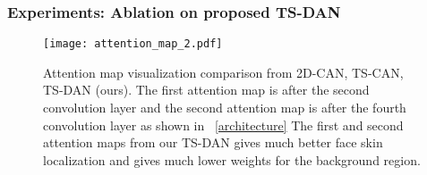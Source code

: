\documentclass[aspectratio=169, table]{beamer}
\begin{document}

\begin{frame}
	\frametitle{\textbf{Experiments: Ablation on proposed TS-DAN}}

\begin{figure}
\begin{center}
\texttt{[image: attention\_map\_2.pdf]}
\end{center}
\caption{Attention map visualization comparison from 2D-CAN\cite{chen2018deepphys}, TS-CAN\cite{liu2020multi}, TS-DAN (ours). The first attention map is after the second convolution layer and the second attention map is after the fourth convolution layer as shown in \figurename~\ref{architecture} The first and second attention maps from our TS-DAN gives much better face skin localization and gives much lower weights for the background region.}
\label{attention_map}
\end{figure}

\end{frame}
\end{document}
